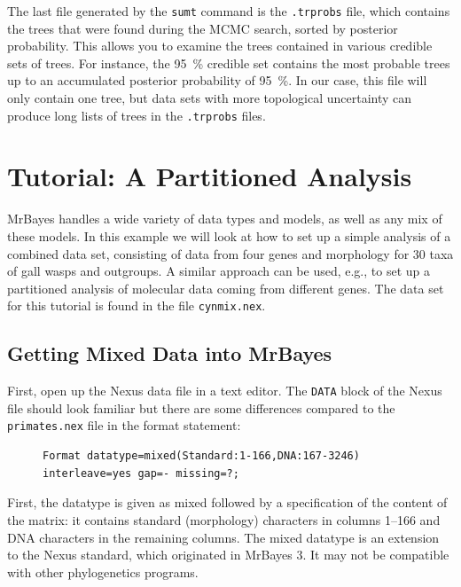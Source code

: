\documentclass[12pt]{book}
\begin{document}
The last file generated by the \texttt{sumt} command is the \texttt{.trprobs} file, which contains
the trees that were found during the MCMC search, sorted by posterior probability. This allows you
to examine the trees contained in various credible sets of trees. For instance, the 95~\% credible
set contains the most probable trees up to an accumulated posterior probability of 95~\%. In our
case, this file will only contain one tree, but data sets with more topological uncertainty can
produce long lists of trees in the \texttt{.trprobs} files.

\chapter{Tutorial: A Partitioned Analysis}\label{tutorialPartitioned}

MrBayes handles a wide variety of data types and models, as well as any mix of these models. In
this example we will look at how to set up a simple analysis of a combined data set, consisting of
data from four genes and morphology for 30 taxa of gall wasps and outgroups. A similar approach can
be used, e.g., to set up a partitioned analysis of molecular data coming from different genes. The
data set for this tutorial is found in the file \texttt{cynmix.nex}. 

\section{Getting Mixed Data into MrBayes}

First, open up the Nexus data file in a text editor. The \texttt{DATA} block of the Nexus file
should look familiar but there are some differences compared to the \texttt{primates.nex} file in
the format statement:

\begin{figure}[h]
\begin{BVerbatim}
Format datatype=mixed(Standard:1-166,DNA:167-3246) interleave=yes gap=- missing=?;
\end{BVerbatim}
\end{figure}

First, the datatype is given as mixed followed by a specification of the content of the matrix: it
contains standard (morphology) characters in columns 1--166 and DNA characters in the remaining
columns. The mixed datatype is an extension to the Nexus standard, which originated in MrBayes 3.
It may not be compatible with other phylogenetics programs.
\end{document}
